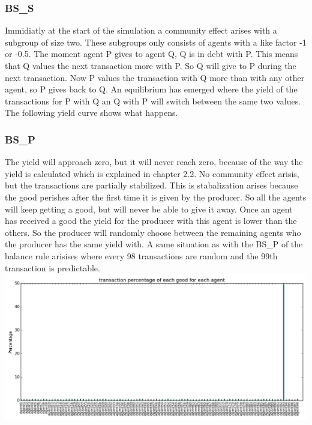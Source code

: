 \documentclass[twoside,openright]{uva-bachelor-thesis}
\begin{document}
\subsubsection{BS\_S}
Immidiatly at the start of the simulation a community effect arises with a subgroup of size two. These subgroups only consists of agents with a like factor -1 or -0.5. The moment agent P gives to agent Q, Q is in debt with P. This means that Q values the next transaction more with P. So Q will give to P during the next transaction. Now P values the transaction with Q more than with any other agent, so P gives back to Q. An equilibrium has emerged where the yield of the transactions for P with Q an Q with P will switch between the same two values. The following yield curve shows what happens. 

\subsubsection{BS\_P}
The yield will approach zero, but it will never reach zero, because of the way the yield is calculated which is explained in chapter 2.2. No community effect arisis, but the transactions are partially stabilized. This is stabalization arises because the good perishes after the first time it is given by the producer. So all the agents will keep getting a good, but will never be able to give it away. Once an agent has received a good the yield for the producer with this agent is lower than the others. So the producer will randomly choose between the remaining agents who the producer has the same yield with. A same situation as with the BS\_P of the balance rule arisises where every 98 transactions are random and the 99th transaction is predictable.
\includegraphics[scale=0.4]{GR_BS_P/4000transactions}
\end{document}
